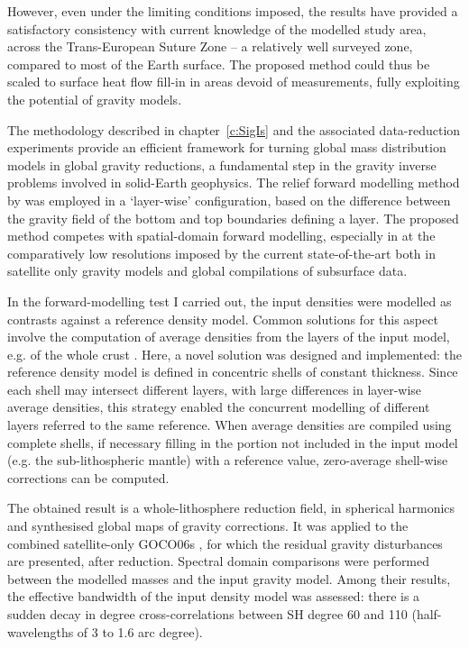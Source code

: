 However, even under the limiting conditions imposed, the results have provided a satisfactory consistency with current knowledge of the modelled study area, across the Trans-European Suture Zone -- a relatively well surveyed zone, compared to most of the Earth surface.
The proposed method could thus be scaled to surface heat flow fill-in in areas devoid of measurements, fully exploiting the potential of gravity models.

The methodology described in chapter~\ref{c:SigIs} and the associated data-reduction experiments provide an efficient framework for turning global mass distribution models in global gravity reductions, a fundamental step in the gravity inverse problems involved in solid-Earth geophysics.
The relief forward modelling method by \textcite{Wieczorek2007} was employed in a `layer-wise' configuration, based on the difference between the gravity field of the bottom and top boundaries defining a layer.
The proposed method competes with spatial-domain forward modelling, especially in at the comparatively low resolutions imposed by the current state-of-the-art both in satellite only gravity models and global compilations of subsurface data.

In the forward-modelling test I carried out, the input densities were modelled as contrasts against a reference density model.
Common solutions for this aspect involve the computation of average densities from the layers of the input model, e.g. of the whole crust \parencites{Tenzer2015}{Tenzer2019}.
Here, a novel solution was designed and implemented: the reference density model is defined in concentric shells of constant thickness.
Since each shell may intersect different layers, with large differences in layer-wise average densities, this strategy enabled the concurrent modelling of different layers referred to the same reference.
When average densities are compiled using complete shells, if necessary filling in the portion not included in the input model (e.g. the sub-lithospheric mantle) with a reference value, zero-average shell-wise corrections can be computed.

The obtained result is a whole-lithosphere reduction field, in spherical harmonics and synthesised global maps of gravity corrections.
It was applied to the combined satellite-only {GOCO06s} \parencite{Kvas_GOCO06s_dataset}, for which the residual gravity disturbances are presented, after reduction.
Spectral domain comparisons were performed between the modelled masses and the input gravity model.
Among their results, the effective bandwidth of the input density model was assessed: there is a sudden decay in degree cross-correlations between SH degree \num{60} and \num{110} (half-wavelengths of \num{3} to \num{1.6} arc degree).

